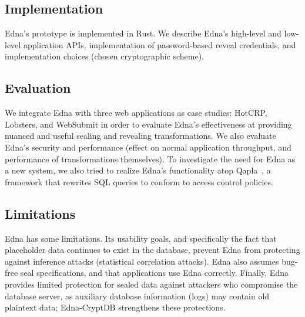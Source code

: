 \subsection{Implementation}
Edna's prototype is implemented in Rust. We describe Edna's high-level and low-level
application APIs, implementation of password-based reveal credentials, and
implementation choices (\eg chosen cryptographic scheme).

\subsection{Evaluation}
We integrate Edna with three web applications as case studies: HotCRP, Lobsters,
and WebSubmit in order to evaluate Edna's effectiveness at providing nuanced and
useful sealing and revealing transformations.
%
We also evaluate Edna's security and performance (\eg effect on normal
application throughput, and performance of transformations themselves).
%
To investigate the need for Edna as a new system, we also tried to realize Edna's
functionality atop Qapla~\cite{qapla}, a framework that rewrites SQL queries to
conform to access control policies. 
\fi

\subsection{Limitations}
Edna has some limitations. Its usability goals, and specifically the fact that
placeholder data continues to exist in the database, prevent Edna from
protecting against inference attacks (\eg statistical correlation attacks). Edna
also assumes bug-free seal specifications, and that applications use
Edna correctly. Finally, Edna provides limited protection for sealed data
against attackers who compromise the database server, as auxiliary database
information (\eg logs) may contain old plaintext data; Edna-CryptDB strengthens
these protections.

